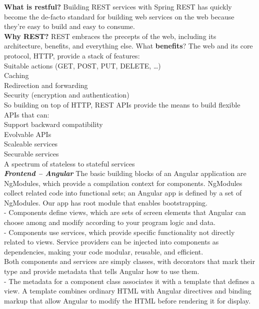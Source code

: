 \documentclass{scrartcl}
\begin{document}
\textbf{What is restful?}
Building REST services with Spring
REST has quickly become the de-facto standard for building web services on the web because they’re easy to build and easy to consume.\\
\textbf{Why REST?} REST embraces the precepts of the web, including its architecture, benefits, and everything else.
What \textbf{benefits}? The web and its core protocol, HTTP, provide a stack of features:\\
Suitable actions (GET, POST, PUT, DELETE, …​)\\
Caching\\
Redirection and forwarding\\
Security (encryption and authentication)\\

So building on top of HTTP, REST APIs provide the means to build flexible APIs that can:\\
Support backward compatibility\\
Evolvable APIs\\

Scaleable services\\

Securable services\\

A spectrum of stateless to stateful services\\


\textbf{\textit{Frontend – Angular }}
The basic building blocks of an Angular application are NgModules, which provide a compilation context for components. NgModules collect related code into functional sets; an Angular app is defined by a set of NgModules. Our app has  root module that enables bootstrapping.\\

 - Components define views, which are sets of screen elements that Angular can choose among and modify according to your program logic and data.\\

 - Components use services, which provide specific functionality not directly related to views. Service providers can be injected into components as dependencies, making your code modular, reusable, and efficient.\\

Both components and services are simply classes, with decorators that mark their type and provide metadata that tells Angular how to use them.\\

 - The metadata for a component class associates it with a template that defines a view. A template combines ordinary HTML with Angular directives and binding markup that allow Angular to modify the HTML before rendering it for display.\\
\end{document}
